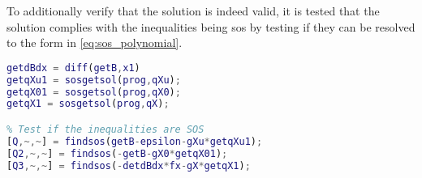 To additionally verify that the solution is indeed valid, it is tested that the solution complies with the inequalities being \gls{sos} by testing if they can be resolved to the form in \autoref{eq:sos_polynomial}.
\begin{lstlisting}[language=matlab]
% Get coefficients for the remaining polynomials
getdBdx = diff(getB,x1)
getqXu1 = sosgetsol(prog,qXu);
getqX01 = sosgetsol(prog,qX0);
getqX1 = sosgetsol(prog,qX);

% Test if the inequalities are SOS
[Q,~,~] = findsos(getB-epsilon-gXu*getqXu1);
[Q2,~,~] = findsos(-getB-gX0*getqX01);
[Q3,~,~] = findsos(-detdBdx*fx-gX*getqX1);
\end{lstlisting}
%
%
%
%
%
%
%
%
%

